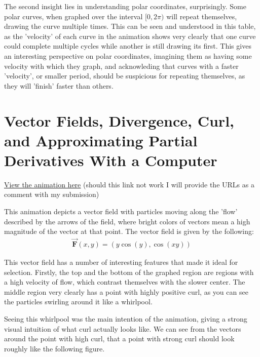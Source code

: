 \documentclass{article}
\begin{document}
    The second insight lies in understanding polar coordinates, surprisingly.
    Some polar curves, when graphed over the interval $[0, 2\pi)$ will repeat themselves, drawing the curve multiple times.
    This can be seen and understood in this table, as the 'velocity' of each curve in the animation shows very clearly that
    one curve could complete multiple cycles while another is still drawing its first.
    This gives an interesting perspective on polar coordinates, imagining them as having some velocity with which they graph,
    and acknowleding that curves with a faster 'velocity', or smaller period, should be suspicious for repeating themselves, as they will 'finish' faster than others.

    \section{Vector Fields, Divergence, Curl, and Approximating Partial Derivatives With a Computer}
    \underline{\href{https://saxten2011.github.io/VectorField/}{View the animation here}} (should this link not work I will provide the URLs as a comment with my submission)

    This animation depicts a vector field with particles moving along the 'flow' described by the arrows of the field, where bright colors of vectors mean a high magnitude of the vector at that point.
    The vector field is given by the following:
    \begin{gather*}
        \vec{ \mathbf{F} } (x, y) = (y \cos(y), \cos(xy)) 
    \end{gather*}

    This vector field has a number of interesting features that made it ideal for selection.
    Firstly, the top and the bottom of the graphed region are regions with a high velocity of flow, which contrast themselves with the slower center.
    The middle region very clearly has a point with highly positive curl, as you can see the particles swirling around it like a whirlpool.

    Seeing this whirlpool was the main intention of the animation, giving a strong visual intuition of what curl actually looks like.
    We can see from the vectors around the point with high curl, that a point with strong curl should look roughly like the following figure.


    \begin{figure}[!h]
        \centering
    \end{figure}
\end{document}
